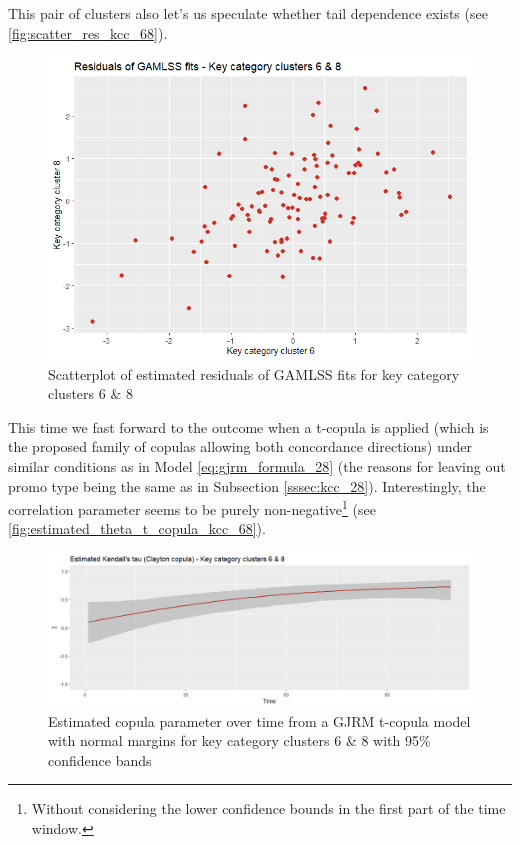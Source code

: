 


This pair of clusters also let's us speculate whether tail dependence exists (see \autoref{fig:scatter_res_kcc_68}).
\\


\begin{figure}[H]
\centering
  \includegraphics[width=0.45\linewidth]{figures/scatter_res_kcc_68.png}
  \caption{Scatterplot of estimated residuals of GAMLSS fits for key category clusters 6 \& 8}
  \label{fig:scatter_res_kcc_68}
\end{figure}


This time we fast forward to the outcome when a t-copula is applied (which is the proposed family of copulas allowing both concordance directions) under similar conditions as in Model \ref{eq:gjrm_formula_28} (the reasons for leaving out promo type being the same as in Subsection \ref{sssec:kcc_28}). Interestingly, the correlation parameter seems to be purely non-negative\footnote{Without considering the lower confidence bounds in the first part of the time window.} (see \autoref{fig:estimated_theta_t_copula_kcc_68}).
\\


\begin{figure}[H]
\centering
  \includegraphics[width=0.95\linewidth]{figures/estimated_theta_t_copula_kcc_68.png}
  \caption{Estimated copula parameter over time from a \ac{GJRM} t-copula model with normal margins for key category clusters 6 \& 8 with 95\% confidence bands}
  \label{fig:estimated_theta_t_copula_kcc_68}
\end{figure}


